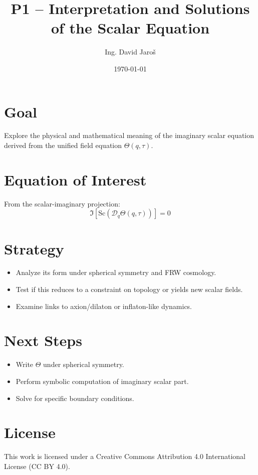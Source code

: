 \documentclass[12pt]{article}
\title{P1 – Interpretation and Solutions of the Scalar Equation}
\author{Ing. David Jaroš}
\date{\today}
\begin{document}
\maketitle

\section*{Goal}
Explore the physical and mathematical meaning of the imaginary scalar equation derived from the unified field equation $\Theta(q, \tau)$.

\section*{Equation of Interest}
From the scalar-imaginary projection:
\[
\Im[\text{Sc}(\mathcal{D}_q \Theta(q, \tau))] = 0
\]

\section*{Strategy}
\begin{itemize}
\item Analyze its form under spherical symmetry and FRW cosmology.
\item Test if this reduces to a constraint on topology or yields new scalar fields.
\item Examine links to axion/dilaton or inflaton-like dynamics.
\end{itemize}

\section*{Next Steps}
\begin{itemize}
\item Write $\Theta$ under spherical symmetry.
\item Perform symbolic computation of imaginary scalar part.
\item Solve for specific boundary conditions.
\end{itemize}


\section*{License}
This work is licensed under a Creative Commons Attribution 4.0 International License (CC BY 4.0).
\end{document}
